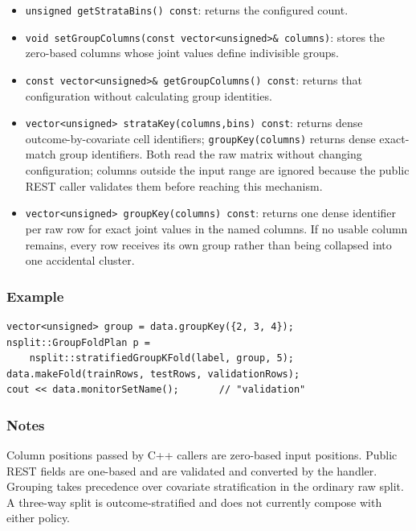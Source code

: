 \begin{itemize}
\item \texttt{unsigned getStrataBins() const}: returns the configured count.
\item \texttt{void setGroupColumns(const vector<unsigned>\& columns)}: stores
      the zero-based columns whose joint values define indivisible groups.
\item \texttt{const vector<unsigned>\& getGroupColumns() const}: returns that
      configuration without calculating group identities.
\item \texttt{vector<unsigned> strataKey(columns,bins) const}: returns dense outcome-by-covariate cell
      identifiers; \texttt{groupKey(columns)} returns dense exact-match group
      identifiers.  Both read the raw matrix without changing configuration;
      columns outside the input range are ignored because the public REST caller
      validates them before reaching this mechanism.
\item \texttt{vector<unsigned> groupKey(columns) const}: returns one dense
      identifier per raw row for exact joint values in the named columns.  If no
      usable column remains, every row receives its own group rather than being
      collapsed into one accidental cluster.
\end{itemize}

\subsubsection{Example}
\begin{verbatim}
vector<unsigned> group = data.groupKey({2, 3, 4});
nsplit::GroupFoldPlan p =
    nsplit::stratifiedGroupKFold(label, group, 5);
data.makeFold(trainRows, testRows, validationRows);
cout << data.monitorSetName();       // "validation"
\end{verbatim}

\subsubsection{Notes}
Column positions passed by C++ callers are zero-based input positions.  Public
REST fields are one-based and are validated and converted by the handler.
Grouping takes precedence over covariate stratification in the ordinary raw
split.  A three-way split is outcome-stratified and does not currently compose
with either policy.


